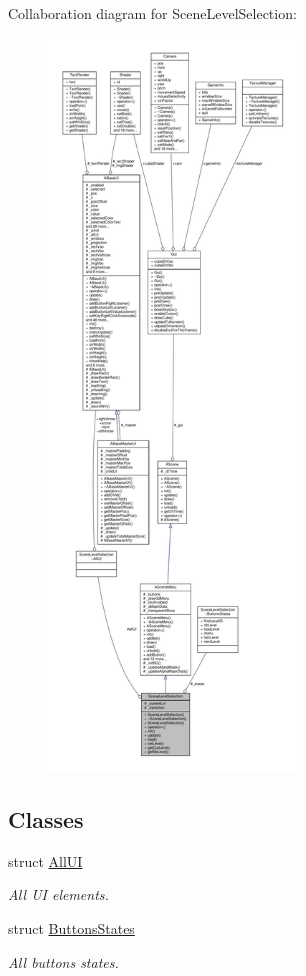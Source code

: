 Collaboration diagram for Scene\+Level\+Selection\+:
\nopagebreak
\begin{figure}[H]
\begin{center}
\leavevmode
\includegraphics[height=550pt]{class_scene_level_selection__coll__graph}
\end{center}
\end{figure}
\subsection*{Classes}
\begin{DoxyCompactItemize}
\item 
struct \hyperlink{struct_scene_level_selection_1_1_all_u_i}{All\+UI}
\begin{DoxyCompactList}\small\item\em All UI elements. \end{DoxyCompactList}\item 
struct \hyperlink{struct_scene_level_selection_1_1_buttons_states}{Buttons\+States}
\begin{DoxyCompactList}\small\item\em All buttons states. \end{DoxyCompactList}\end{DoxyCompactItemize}
